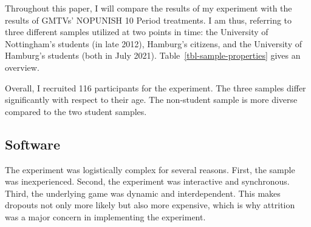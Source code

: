 \documentclass[
  authoryear,
  review,
  3p,
  onecolumn]{elsarticle}
\begin{document}
Throughout this paper, I will compare the results of my experiment with
the results of GMTVs' NOPUNISH 10 Period treatments. I am thus,
referring to three different samples utilized at two points in time: the
University of Nottingham's students (in late 2012), Hamburg's citizens,
and the University of Hamburg's students (both in July 2021).
Table~\ref{tbl-sample-properties} gives an overview.

\hypertarget{tbl-sample-properties}{}
\begin{table}[!htbp] \centering \renewcommand*{\arraystretch}{1.1}\caption{\label{tbl-sample-properties}Sample Properties }
\end{table}

Overall, I recruited 116 participants for the experiment. The three
samples differ significantly with respect to their age. The non-student
sample is more diverse compared to the two student samples.

\hypertarget{sec-software}{%
\subsection{Software}\label{sec-software}}

The experiment was logistically complex for several reasons. First, the
sample was inexperienced. Second, the experiment was interactive and
synchronous. Third, the underlying game was dynamic and interdependent.
This makes dropouts not only more likely but also more expensive, which
is why attrition was a major concern in implementing the experiment.
\end{document}
